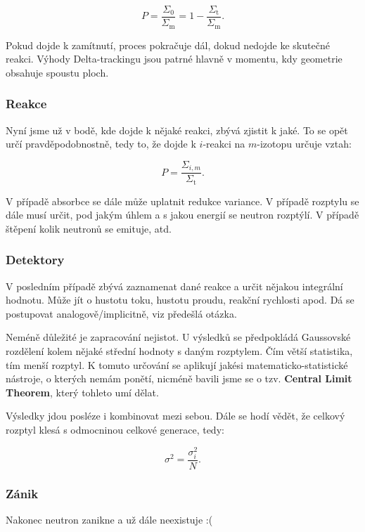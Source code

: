 $$ P = \dfrac{\Sigma_0}{\Sigma_\text{m}} = 1 - \dfrac{\Sigma_\text{t}}{\Sigma_\text{m}}. $$

Pokud dojde k zamítnutí, proces pokračuje dál, dokud nedojde ke skutečné reakci. Výhody Delta-trackingu jsou patrné hlavně v momentu, kdy geometrie obsahuje spoustu ploch.

\subsubsection{Reakce}

Nyní jsme už v bodě, kde dojde k nějaké reakci, zbývá zjistit k jaké. To se opět určí pravděpodobnostně, tedy to, že dojde k $i$-reakci na $m$-izotopu určuje vztah:

$$ P = \dfrac{\Sigma_{i,m}}{\Sigma_\text{t}}. $$

V případě absorbce se dále může uplatnit redukce variance. V případě rozptylu se dále musí určit, pod jakým úhlem a s jakou energií se neutron rozptýlí. V případě štěpení kolik neutronů se emituje, atd. 

\subsubsection{Detektory}

V posledním případě zbývá zaznamenat dané reakce a určit nějakou integrální hodnotu. Může jít o hustotu toku, hustotu proudu, reakční rychlosti apod. Dá se postupovat analogově/implicitně, viz předešlá otázka.

Neméně důležité je zapracování nejistot. U výsledků se předpokládá Gaussovské rozdělení kolem nějaké střední hodnoty s daným rozptylem. Čím větší statistika, tím menší rozptyl. K tomuto určování se aplikují jakési matematicko-statistické nástroje, o kterých nemám ponětí, nicméně bavili jsme se o tzv. \textbf{Central Limit Theorem}, který tohleto umí dělat.

Výsledky jdou posléze i kombinovat mezi sebou. Dále se hodí vědět, že celkový rozptyl klesá s odmocninou celkové generace, tedy:

$$ \sigma^2 = \dfrac{\sigma^2_i}{N}. $$

\subsubsection{Zánik}

Nakonec neutron zanikne a už dále neexistuje :(